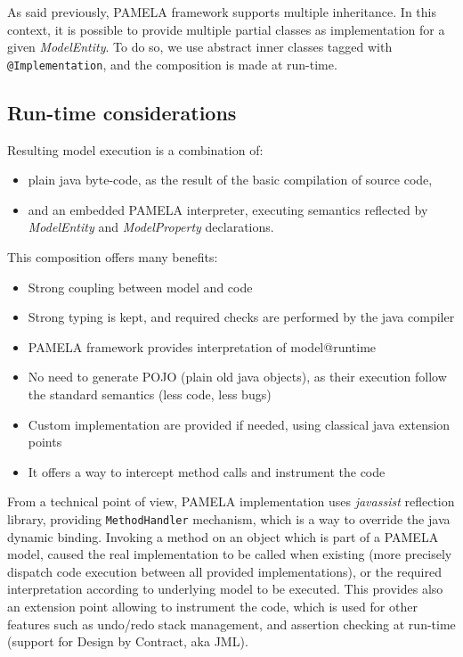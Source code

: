 As said previously, PAMELA framework supports multiple inheritance. In this context, it is possible to provide multiple partial classes as implementation for a given \emph{ModelEntity}. To do so, we use abstract inner classes tagged with \texttt{@Implementation}, and the composition is made at run-time.

\subsection{Run-time considerations}

Resulting model execution is a combination of:
\begin{itemize}
    \item plain java byte-code, as the result of the basic compilation of source code,
    \item and an embedded PAMELA interpreter, executing semantics reflected by \emph{ModelEntity} and \emph{ModelProperty} declarations.
\end{itemize}
 
This composition offers many benefits: 
\begin{itemize}
    \item Strong coupling between model and code
    \item Strong typing is kept, and required checks are performed by the java compiler
    \item PAMELA framework provides interpretation of model@runtime
    \item No need to generate POJO (plain old java objects), as their execution follow the standard semantics (less code, less bugs)
    \item Custom implementation are provided if needed, using classical java extension points
    \item It offers a way to intercept method calls and instrument the code
\end{itemize}

From a technical point of view, PAMELA implementation uses \emph{javassist} reflection library, providing \texttt{MethodHandler} mechanism, which is a way to override the java dynamic binding. Invoking a method on an object which is part of a PAMELA model, caused the real implementation to be called when existing (more precisely dispatch code execution between all provided implementations), or the required interpretation according to underlying model to be executed. This provides also an extension point allowing to instrument the code, which is used for other features such as undo/redo stack management, and assertion checking at run-time (support for Design by Contract, aka JML).

